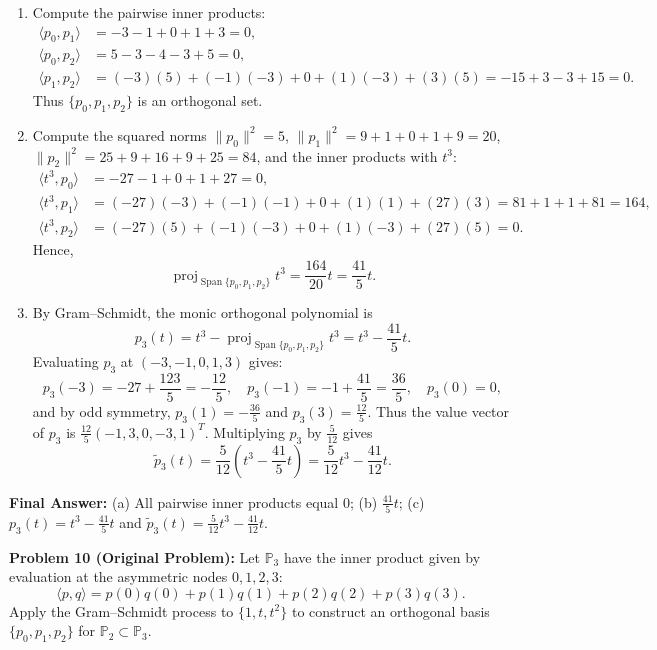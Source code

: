 \documentclass[11pt, letterpaper]{article}
\theoremstyle{definition}
\theoremstyle{remark}
\begin{document}
\begin{enumerate}[label=(\alph*)]
    \item Compute the pairwise inner products:
    \begin{align*}
    \langle p_0, p_1 \rangle &= -3 - 1 + 0 + 1 + 3 = 0, \\
    \langle p_0, p_2 \rangle &= 5 - 3 - 4 - 3 + 5 = 0, \\
    \langle p_1, p_2 \rangle &= (-3)(5) + (-1)(-3) + 0 + (1)(-3) + (3)(5) = -15 + 3 - 3 + 15 = 0.
    \end{align*}
    Thus $\{p_0, p_1, p_2\}$ is an orthogonal set.
    \item Compute the squared norms $\|p_0\|^2 = 5$, $\|p_1\|^2 = 9 + 1 + 0 + 1 + 9 = 20$, $\|p_2\|^2 = 25 + 9 + 16 + 9 + 25 = 84$, and the inner products with $t^3$:
    \begin{align*}
    \langle t^3, p_0 \rangle &= -27 - 1 + 0 + 1 + 27 = 0, \\
    \langle t^3, p_1 \rangle &= (-27)(-3) + (-1)(-1) + 0 + (1)(1) + (27)(3) = 81 + 1 + 1 + 81 = 164, \\
    \langle t^3, p_2 \rangle &= (-27)(5) + (-1)(-3) + 0 + (1)(-3) + (27)(5) = 0.
    \end{align*}
    Hence,
    \[
    \operatorname{proj}_{\operatorname{Span}\{p_0, p_1, p_2\}} t^3 = \frac{164}{20}t = \frac{41}{5}t.
    \]
    \item By Gram--Schmidt, the monic orthogonal polynomial is
    \[
    p_3(t) = t^3 - \operatorname{proj}_{\operatorname{Span}\{p_0, p_1, p_2\}} t^3 = t^3 - \frac{41}{5}t.
    \]
    Evaluating $p_3$ at $(-3, -1, 0, 1, 3)$ gives:
    \[
    p_3(-3) = -27 + \frac{123}{5} = -\frac{12}{5}, \quad p_3(-1) = -1 + \frac{41}{5} = \frac{36}{5}, \quad p_3(0) = 0,
    \]
    and by odd symmetry, $p_3(1) = -\frac{36}{5}$ and $p_3(3) = \frac{12}{5}$. Thus the value vector of $p_3$ is $\frac{12}{5}(-1, 3, 0, -3, 1)^T$. Multiplying $p_3$ by $\frac{5}{12}$ gives
    \[
    \tilde{p}_3(t) = \frac{5}{12}\left(t^3 - \frac{41}{5}t\right) = \frac{5}{12}t^3 - \frac{41}{12}t.
    \]
\end{enumerate}
\textbf{Final Answer:} (a) All pairwise inner products equal $0$; (b) $\frac{41}{5}t$; (c) $p_3(t) = t^3 - \frac{41}{5}t$ and $\tilde{p}_3(t) = \frac{5}{12}t^3 - \frac{41}{12}t$.

\medskip

\textbf{Problem 10 (Original Problem):} Let $\mathbb{P}_3$ have the inner product given by evaluation at the asymmetric nodes $0, 1, 2, 3$:
\[
\langle p, q \rangle = p(0)q(0) + p(1)q(1) + p(2)q(2) + p(3)q(3).
\]
Apply the Gram--Schmidt process to $\{1, t, t^2\}$ to construct an orthogonal basis $\{p_0, p_1, p_2\}$ for $\mathbb{P}_2 \subset \mathbb{P}_3$.
\end{document}
